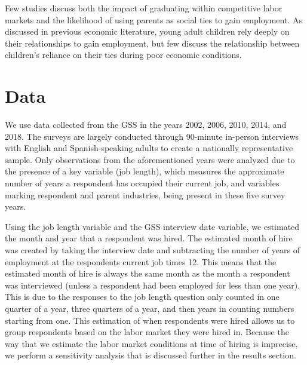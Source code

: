 \documentclass[12pt]{article}
\begin{document}
Few studies discuss both the impact of graduating within competitive labor markets and the likelihood of using parents as social ties to gain employment. As discussed in previous economic literature, young adult children rely deeply on their relationships to gain employment, but few discuss the relationship between children’s reliance on their ties during poor economic conditions.

\section{Data}
\label{sec:data}
We use data collected from the GSS in the years 2002, 2006, 2010, 2014, and 2018. The surveys are largely conducted through 90-minute in-person interviews with English and Spanish-speaking adults to create a nationally representative sample. Only observations from the aforementioned years were analyzed due to the presence of a key variable (job length), which measures the approximate number of years a respondent has occupied their current job, and variables marking respondent and parent industries, being present in these five survey years. 

Using the job length variable and the GSS interview date variable, we estimated the month and year that a respondent was hired. The estimated month of hire was created by taking the interview date and subtracting the number of years of employment at the respondents current job times 12. This means that the estimated month of hire is always the same month as the month a respondent was interviewed (unless a respondent had been employed for less than one year). This is due to the responses to the job length question only counted in one quarter of a year, three quarters of a year, and then years in counting numbers starting from one. This estimation of when respondents were hired allows us to group respondents based on the labor market they were hired in. Because the way that we estimate the labor market conditions at time of hiring is imprecise, we perform a sensitivity analysis that is discussed further in the results section.
\end{document}
